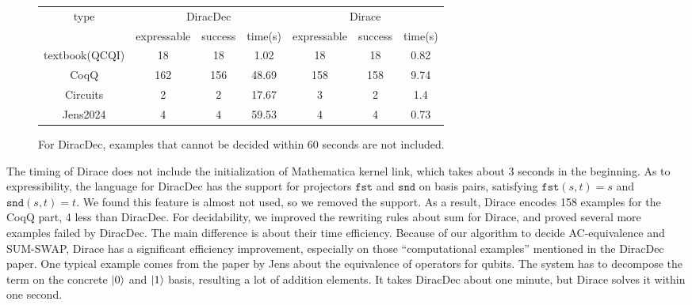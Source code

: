 \documentclass[runningheads]{llncs}
\begin{document}
\begin{figure}
    \center
    \begin{tabular}{c|c c c|c c c}
        \hline
        \multirow{2}{*}{type} & \multicolumn{3}{c|}{DiracDec} & \multicolumn{3}{c}{Dirace} \\
        \cline{2-7}
                                 & expressable & success & time(s)           & expressable & success & time(s)                 \\
        \hline
        textbook(QCQI)          & 18          & 18        &    1.02        &    18      & 18          &   0.82      \\
        CoqQ                    & 162          & 156       &    48.69       &   158     &  158   &     9.74     \\
        Circuits                 & 2          & 2       &    17.67       &   3     &  2   &     1.4     \\
        Jens2024                & 4          & 4         &  59.53       &   4    & 4       &  0.73     \\
        \hline
    \end{tabular}        
    \caption{For DiracDec, examples that cannot be decided within 60 seconds are not included.}
\end{figure}

The timing of Dirace does not include the initialization of Mathematica kernel link, which takes about 3 seconds in the beginning.
As to expressibility, the language for DiracDec has the support for projectors $\texttt{fst}$ and $\texttt{snd}$ on basis pairs, satisfying $\texttt{fst} (s, t) = s$ and $\texttt{snd} (s, t) = t$. We found this feature is almost not used, so we removed the support. As a result, Dirace encodes 158 examples for the CoqQ part, 4 less than DiracDec. For decidability, we improved the rewriting rules about sum for Dirace, and proved several more examples failed by DiracDec. 
The main difference is about their time efficiency. Because of our algorithm to decide AC-equivalence and SUM-SWAP, Dirace has a significant efficiency improvement, especially on those ``computational examples'' mentioned in the DiracDec paper.
One typical example comes from the paper by Jens about the equivalence of operators for qubits. The system has to decompose the term on the concrete $\ket{0}$ and $\ket{1}$ basis, resulting a lot of addition elements. It takes DiracDec about one minute, but Dirace solves it within one second.
\end{document}
